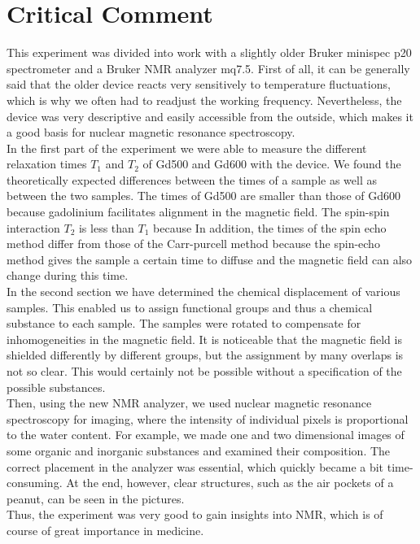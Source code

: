 \section{Critical Comment}
This experiment was divided into work with a slightly older Bruker minispec p20 spectrometer and a Bruker NMR analyzer mq7.5.
First of all, it can be generally said that the older device reacts very sensitively to temperature fluctuations, which is why we often had to readjust the working frequency.
Nevertheless, the device was very descriptive and easily accessible from the outside, which makes it a good basis for nuclear magnetic resonance spectroscopy.\\
In the first part of the experiment we were able to measure the different relaxation times $T_1$ and $T_2$ of Gd500 and Gd600 with the device.
We found the theoretically expected differences between the times of a sample as well as between the two samples.
The times of Gd500 are smaller than those of Gd600 because gadolinium facilitates alignment in the magnetic field.
The spin-spin interaction $T_2$ is less than $T_1$ because%
In addition, the times of the spin echo method differ from those of the Carr-purcell method because the spin-echo method gives the sample a certain time to diffuse and the magnetic field can also change during this time.\\
In the second section we have determined the chemical displacement of various samples.
This enabled us to assign functional groups and thus a chemical substance to each sample.
The samples were rotated to compensate for inhomogeneities in the magnetic field.
It is noticeable that the magnetic field is shielded differently by different groups, but the assignment by many overlaps is not so clear.
This would certainly not be possible without a specification of the possible substances.\\
Then, using the new NMR analyzer, we used nuclear magnetic resonance spectroscopy for imaging, where the intensity of individual pixels is proportional to the water content.
For example, we made one and two dimensional images of some organic and inorganic substances and examined their composition.
The correct placement in the analyzer was essential, which quickly became a bit time-consuming.
At the end, however, clear structures, such as the air pockets of a peanut, can be seen in the pictures.\\
Thus, the experiment was very good to gain insights into NMR, which is of course of great importance in medicine. 